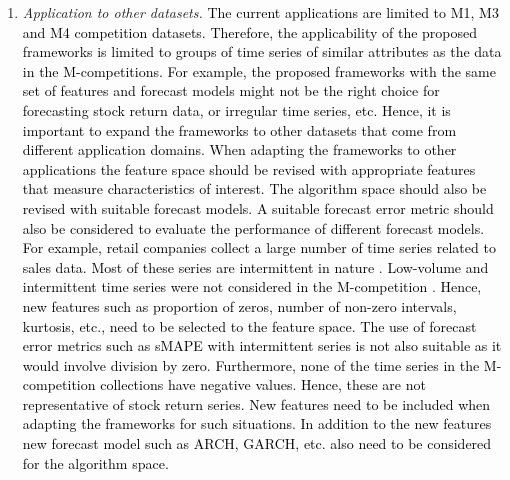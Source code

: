 \documentclass{monashthesis}
\begin{document}
\begin{enumerate}
\def\labelenumi{\arabic{enumi}.}
\item
  \emph{Application to other datasets.} \textcolor{black}{The current applications are limited to M1, M3 and M4 competition datasets. Therefore, the applicability of the proposed frameworks is limited to groups of time series of similar attributes as the data in the M-competitions. For example, the proposed frameworks with the same set of features and forecast models might not be the right choice for forecasting stock return data, or irregular time series, etc. Hence, it is important to expand the frameworks to other datasets that come from different application domains. When adapting the frameworks to other applications the feature space should be revised with appropriate features that measure characteristics of interest. The algorithm space should also be revised with suitable forecast models. A suitable forecast error metric should also be considered to evaluate the performance of different forecast models. For example, retail companies collect a large number of time series related to sales data. Most of these series are intermittent in nature} \autocite{seaman2018considerations}. \textcolor{black}{Low-volume and intermittent time series were not considered in the M-competition} \autocite{makridakis2019m4}. \textcolor{black}{Hence, new features such as proportion of zeros, number of non-zero intervals, kurtosis, etc., need to be selected to the feature space. The use of forecast error metrics such as sMAPE with intermittent series is not also suitable as it would involve division by zero. Furthermore, none of the time series in the M-competition collections have negative values. Hence, these are not representative of stock return series. New features need to be included when adapting the frameworks for such situations. In addition to the new features new forecast model such as ARCH, GARCH, etc. also need to be considered for the algorithm space.}


\end{enumerate}
\end{document}

